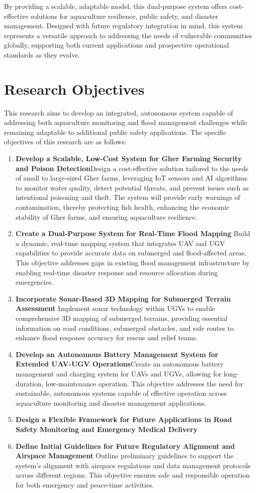 \documentclass[conference]{IEEEtran}
\begin{document}
By providing a scalable, adaptable model, this dual-purpose system offers cost-effective solutions for aquaculture resilience, public safety, and disaster management. Designed with future regulatory integration in mind, this system represents a versatile approach to addressing the needs of vulnerable communities globally, supporting both current applications and prospective operational standards as they evolve.

	
\section{\textbf{Research Objectives}}
This research aims to develop an integrated, autonomous system capable of addressing both aquaculture monitoring and flood management challenges while remaining adaptable to additional public safety applications. The specific objectives of this research are as follows:
\begin{enumerate}
	\item \textbf{Develop a Scalable, Low-Cost System for Gher Farming Security and Poison Detection}Design a cost-effective solution tailored to the needs of small to large-sized Gher farms, leveraging IoT sensors and AI algorithms to monitor water quality, detect potential threats, and prevent issues such as intentional poisoning and theft. The system will provide early warnings of contamination, thereby protecting fish health, enhancing the economic stability of Gher farms, and ensuring aquaculture resilience.
	\item \textbf{Create a Dual-Purpose System for Real-Time Flood Mapping }
	Build a dynamic, real-time mapping system that integrates UAV and UGV capabilities to provide accurate data on submerged and flood-affected areas. This objective addresses gaps in existing flood management infrastructure by enabling real-time disaster response and resource allocation during emergencies.
	\item \textbf{Incorporate Sonar-Based 3D Mapping for Submerged Terrain Assessment }
	Implement sonar technology within UGVs to enable comprehensive 3D mapping of submerged terrains, providing essential information on road conditions, submerged obstacles, and safe routes to enhance flood response accuracy for rescue and relief teams.
	\item \textbf{Develop an Autonomous Battery Management System for Extended UAV-UGV Operations}Create an autonomous battery management and charging system for UAVs and UGVs, allowing for long-duration, low-maintenance operation. This objective addresses the need for sustainable, autonomous systems capable of effective operation across aquaculture monitoring and disaster management applications.
	\item \textbf{Design a Flexible Framework for Future Applications in Road Safety Monitoring and Emergency Medical Delivery}
	\item \textbf{Define Initial Guidelines for Future Regulatory Alignment and Airspace Management}
	Outline preliminary guidelines to support the system's alignment with airspace regulations and data management protocols across different regions. This objective ensures safe and responsible operation for both emergency and peace-time activities.
\end{enumerate}
\end{document}
